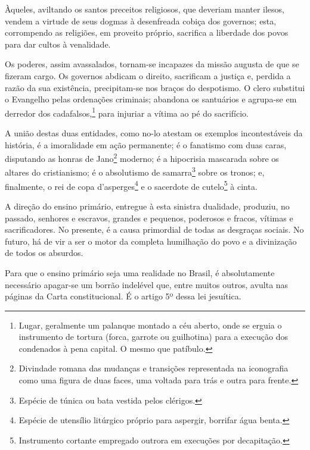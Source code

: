 Àqueles, aviltando os santos preceitos religiosos, que deveriam manter
ilesos, vendem a virtude de seus dogmas à desenfreada cobiça dos
governos; esta, corrompendo as religiões, em proveito próprio, sacrifica
a liberdade dos povos para dar cultos à venalidade.

Os poderes, assim avassalados, tornam-se incapazes da missão augusta de
que se fizeram cargo. Os governos abdicam o direito, sacrificam a
justiça e, perdida a razão da sua existência, precipitam-se nos braços
do despotismo. O clero substitui o Evangelho pelas ordenações criminais;
abandona os santuários e agrupa-se em derredor dos
cadafalsos,\footnote{Lugar, geralmente um palanque montado a céu
  aberto, onde se erguia o instrumento de tortura (forca, garrote ou
  guilhotina) para a execução dos condenados à pena capital. O mesmo que
  patíbulo.\label{cadafalso}} para injuriar a vítima ao pé do sacrifício.

A união destas duas entidades, como no-lo atestam os exemplos
incontestáveis da história, é a imoralidade em ação permanente; é o
fanatismo com duas caras, disputando as honras de Jano\footnote{
  Divindade romana das mudanças e transições representada na iconografia
  como uma figura de duas faces, uma voltada para trás e outra para
  frente.} moderno; é a hipocrisia mascarada sobre os altares do
cristianismo; é o absolutismo de samarra\footnote{Espécie de túnica ou
  bata vestida pelos clérigos.} sobre os tronos; e, finalmente, o rei de
copa d'asperges\footnote{Espécie de utensílio litúrgico próprio para
  aspergir, borrifar água benta.} e o sacerdote de cutelo\footnote{
  Instrumento cortante empregado outrora em execuções por decapitação.}
à cinta.

A direção do ensino primário, entregue à esta sinistra dualidade,
produziu, no passado, senhores e escravos, grandes e pequenos, poderosos
e fracos, vítimas e sacrificadores. No presente, é a causa primordial de
todas as desgraças sociais. No futuro, há de vir a ser o motor da
completa humilhação do povo e a divinização de todos os absurdos.

Para que o ensino primário seja uma realidade no Brasil, é absolutamente
necessário apagar-se um borrão indelével que, entre muitos outros,
avulta nas páginas da Carta constitucional. É o artigo 5º dessa lei
jesuítica.

